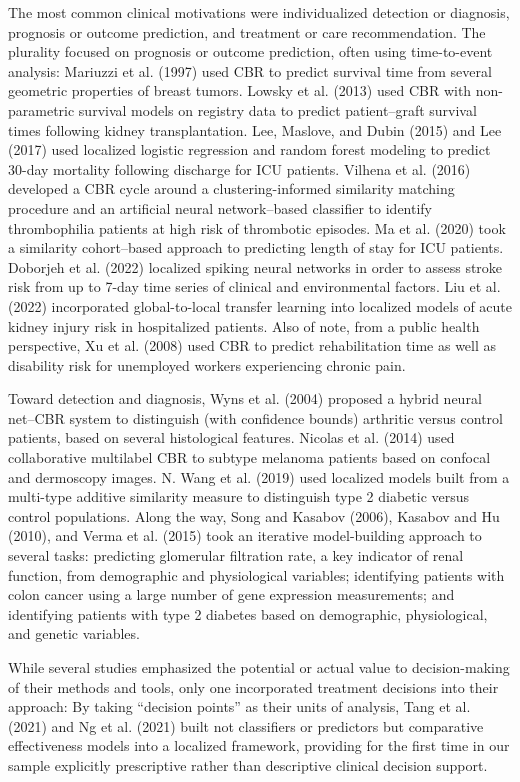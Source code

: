 \documentclass{article}
\begin{document}
The most common clinical motivations were individualized detection or
diagnosis, prognosis or outcome prediction, and treatment or care
recommendation. The plurality focused on prognosis or outcome
prediction, often using time-to-event analysis: Mariuzzi et al. (1997)
used CBR to predict survival time from several geometric properties of
breast tumors. Lowsky et al. (2013) used CBR with non-parametric
survival models on registry data to predict patient--graft survival
times following kidney transplantation. Lee, Maslove, and Dubin (2015)
and Lee (2017) used localized logistic regression and random forest
modeling to predict 30-day mortality following discharge for ICU
patients. Vilhena et al. (2016) developed a CBR cycle around a
clustering-informed similarity matching procedure and an artificial
neural network--based classifier to identify thrombophilia patients at
high risk of thrombotic episodes. Ma et al. (2020) took a similarity
cohort--based approach to predicting length of stay for ICU patients.
Doborjeh et al. (2022) localized spiking neural networks in order to
assess stroke risk from up to 7-day time series of clinical and
environmental factors. Liu et al. (2022) incorporated global-to-local
transfer learning into localized models of acute kidney injury risk in
hospitalized patients. Also of note, from a public health perspective,
Xu et al. (2008) used CBR to predict rehabilitation time as well as
disability risk for unemployed workers experiencing chronic pain.

Toward detection and diagnosis, Wyns et al. (2004) proposed a hybrid
neural net--CBR system to distinguish (with confidence bounds) arthritic
versus control patients, based on several histological features. Nicolas
et al. (2014) used collaborative multilabel CBR to subtype melanoma
patients based on confocal and dermoscopy images. N. Wang et al. (2019)
used localized models built from a multi-type additive similarity
measure to distinguish type 2 diabetic versus control populations. Along
the way, Song and Kasabov (2006), Kasabov and Hu (2010), and Verma et
al. (2015) took an iterative model-building approach to several tasks:
predicting glomerular filtration rate, a key indicator of renal
function, from demographic and physiological variables; identifying
patients with colon cancer using a large number of gene expression
measurements; and identifying patients with type 2 diabetes based on
demographic, physiological, and genetic variables.

While several studies emphasized the potential or actual value to
decision-making of their methods and tools, only one incorporated
treatment decisions into their approach: By taking ``decision points''
as their units of analysis, Tang et al. (2021) and Ng et al. (2021)
built not classifiers or predictors but comparative effectiveness models
into a localized framework, providing for the first time in our sample
explicitly prescriptive rather than descriptive clinical decision
support.
\end{document}
